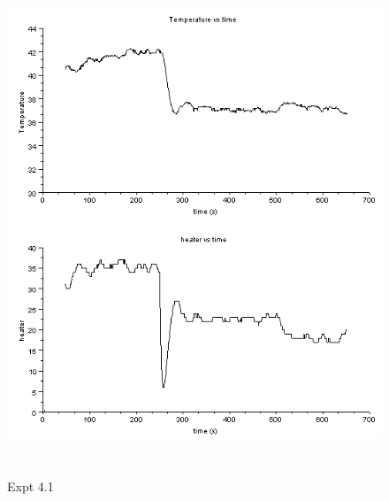 \begin{figure}[H]
  \includegraphics[width=12cm, height=15cm]{mpc/4_1_heater_final.png}
  \caption{Expt 4.1}
\end{figure}


